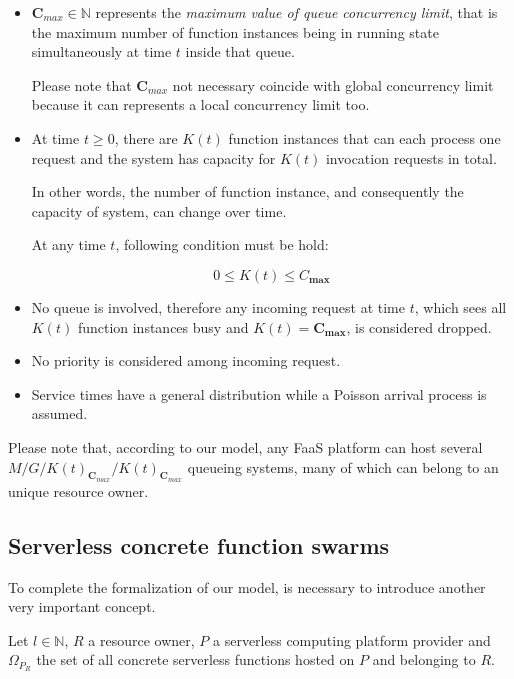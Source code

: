 \documentclass[10pt,a4paper]{report}
\newcommand*{\N}{\mathbb{N}}
\theoremstyle{definition}
\begin{document}
\begin{itemize}
	
	\item $\textbf{C}_{max} \in \N$ represents the \textit{maximum value of queue concurrency limit}, that is the maximum number of function instances being in running state simultaneously at time $t$ inside that queue. 
	
	Please note that $\textbf{C}_{max}$ not necessary coincide with global concurrency limit because it can represents a local concurrency limit too.
	
	\item At time $t \geq 0$, there are $K(t)$ function instances that can each process one request and the system has capacity for $K(t)$ invocation requests in total. 
	
	In other words, the number of function instance, and consequently the capacity of system, can change over time. 
	
	At any time $t$, following condition must be hold:
	
	\begin{equation}
		0 \leq K(t) \leq {C}_{\textbf{max}}
	\end{equation}
	
	\item No queue is involved, therefore any incoming request at time $t$, which sees all $K(t)$ function instances busy and $K(t) = \textbf{C}_{\textbf{max}}$, is considered dropped.
	
	\item No priority is considered among incoming request.
	
	\item Service times have a general distribution while a Poisson arrival process is assumed.
\end{itemize} 

Please note that, according to our model, any FaaS platform can host several $M/G/K(t)_{\textbf{C}_{max}}/K(t)_{\textbf{C}_{max}}$ queueing systems, many of which can belong to an unique resource owner.  

\subsection{Serverless concrete function swarms}

To complete the formalization of our model, is necessary to introduce another very important concept.

Let $l \in \N$, $R$ a resource owner, $P$ a serverless computing platform provider and $\Omega_{P_R}$ the set of all concrete serverless functions hosted on $P$ and belonging to $R$. 
\end{document}
